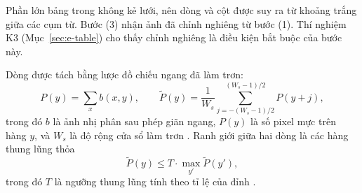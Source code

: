Phần lớn bảng trong  không kẻ lưới, nên dòng và cột được suy ra từ khoảng trắng giữa các cụm từ.
Bước (3) nhận ảnh đã chỉnh nghiêng từ bước (1).
Thí nghiệm K3 (Mục~\ref{sec:e-table}) cho thấy chỉnh nghiêng là điều kiện bắt buộc của bước này.

Dòng được tách bằng lược đồ chiếu ngang đã làm trơn:
\begin{equation}\label{eq:proj}
  P(y)=\sum_x b(x,y),\qquad
  \tilde P(y)=\frac{1}{W_s}\sum_{j=-(W_s-1)/2}^{(W_s-1)/2} P(y+j),
\end{equation}
trong đó $b$ là ảnh nhị phân sau phép giãn ngang, $P(y)$ là số pixel mực trên hàng $y$, và $W_s$ là độ rộng cửa sổ làm trơn .
Ranh giới giữa hai dòng là các hàng thung lũng thỏa
\begin{equation}\label{eq:valley}
  \tilde P(y)\le T\cdot\max_{y'}\tilde P(y'),
\end{equation}
trong đó $T$ là ngưỡng thung lũng tính theo tỉ lệ của đỉnh .

